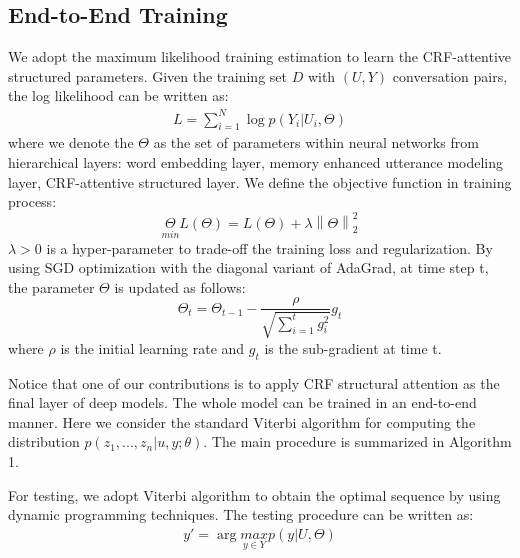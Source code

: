 \documentclass[sigconf]{acmart}
\begin{document}
\subsection{End-to-End Training}
We adopt the maximum likelihood training estimation to learn the CRF-attentive structured parameters. Given the training set $D$ with $(U,Y)$ conversation pairs, the log likelihood can be written as:
\begin{align*}
	L=\sum_{i=1}^{N}\log p(Y_i|U_i,\Theta) \tag{11}
\end{align*}
where we denote the $\Theta$ as the set of parameters within neural networks from hierarchical layers: word embedding layer, memory enhanced utterance modeling layer, CRF-attentive structured layer. We define the objective function in training process:
\begin{equation}
\underset{min}{\Theta}L(\Theta)=L(\Theta)+\lambda \left \| \Theta \right \|_{2}^{2} \tag{12}
\end{equation}
$\lambda>0$ is a hyper-parameter to trade-off the training loss and regularization. By using SGD optimization with the diagonal variant of AdaGrad, at time step t, the parameter $\Theta$ is updated as follows:
\begin{equation}
\Theta_t=\Theta_{t-1} - \frac{\rho }{\sqrt{\sum_{i=1}^{t}g_i^2}}g_t \tag{13}
\end{equation}
where $\rho$ is the initial learning rate and $g_t$ is the sub-gradient at time t.

Notice that one of our contributions is to apply CRF structural attention as the final layer of deep models. The whole model can be trained in an end-to-end manner. Here we consider the standard Viterbi algorithm for computing the distribution $p(z_1,...,z_n|u,y;\theta)$. The main procedure is summarized in Algorithm 1.

For testing, we adopt Viterbi algorithm to obtain the optimal sequence by using dynamic programming techniques. The testing procedure can be written as:
\begin{align*}
	y'=\arg \underset{y\in Y}{max} p(y|U,\Theta) \tag{14}
\end{align*} 
\end{document}
